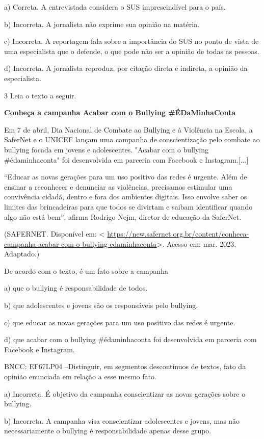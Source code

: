 {a) Correta. A entrevistada considera o SUS imprescindível para o país.

b) Incorreta. A jornalista não exprime sua opinião na matéria.

c) Incorreta. A reportagem fala sobre a importância do SUS no ponto de
vista de uma especialista que o defende, o que pode não ser a opinião de
todas as pessoas.

d) Incorreta. A jornalista reproduz, por citação direta e indireta, a
opinião da especialista.

\num{3} Leia o texto a seguir.

\textbf{Conheça a campanha Acabar com o Bullying \#ÉDaMinhaConta}

Em 7 de abril, Dia Nacional de Combate ao Bullying e à Violência na
Escola, a SaferNet e o UNICEF lançam uma campanha de conscientização
pelo combate ao bullying focada em jovens e adolescentes. "Acabar com o
bullying \#édaminhaconta" foi desenvolvida em parceria com Facebook e
Instagram.{[}...{]}

``Educar as novas gerações para um uso positivo das redes é urgente.
Além de ensinar a reconhecer e denunciar as violências, precisamos
estimular uma convivência cidadã, dentro e fora dos ambientes digitais.
Isso envolve saber os limites das brincadeiras para que todos se
divirtam e saibam identificar quando algo não está bem'', afirma Rodrigo
Nejm, diretor de educação da SaferNet.

(SAFERNET. Disponível em: \textless{}
\url{https://new.safernet.org.br/content/conheca-campanha-acabar-com-o-bullying-edaminhaconta}\textgreater.
Acesso em: mar. 2023. Adaptado.)

De acordo com o texto, é um fato sobre a campanha

a) que o bullying é responsabilidade de todos.

b) que adolescentes e jovens são os responsáveis pelo bullying.

c) que educar as novas gerações para um uso positivo das redes é
urgente.

d) que acabar com o bullying \#édaminhaconta foi desenvolvida em
parceria com Facebook e Instagram.

BNCC: EF67LP04 --Distinguir, em segmentos descontínuos de textos, fato
da opinião enunciada em relação a esse mesmo fato.

a) Incorreta. É objetivo da campanha conscientizar as novas gerações
sobre o bullying.

b) Incorreta. A campanha visa conscientizar adolescentes e jovens, mas
não necessariamente o bullying é responsabilidade apenas desse grupo.

}
